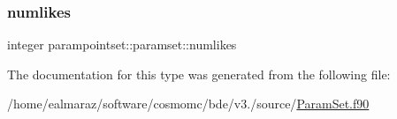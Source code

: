 \subsubsection{\texorpdfstring{numlikes}{numlikes}}
{\footnotesize\ttfamily integer parampointset\+::paramset\+::numlikes}



The documentation for this type was generated from the following file\+:\begin{DoxyCompactItemize}
\item 
/home/ealmaraz/software/cosmomc/bde/v3./source/\mbox{\hyperlink{ParamSet_8f90}{Param\+Set.\+f90}}\end{DoxyCompactItemize}
